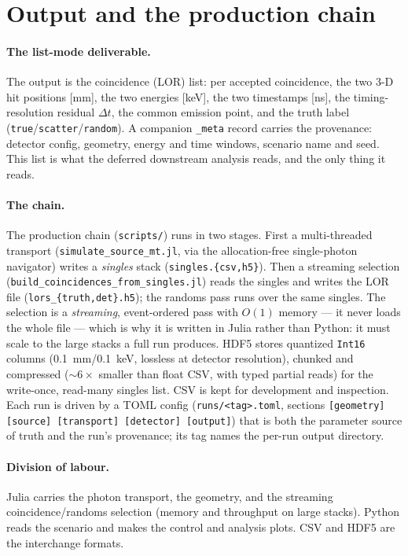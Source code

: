 \documentclass[11pt]{article}
\begin{document}
\section{Output and the production chain}
\label{sec:output}

\paragraph{The list-mode deliverable.}
The output is the coincidence (LOR) list: per accepted coincidence, the two \mbox{3-D} hit
positions [\si{mm}], the two energies [\si{keV}], the two timestamps [\si{ns}], the
timing-resolution residual $\Delta t$, the common emission point, and the truth label
(\texttt{true}/\texttt{scatter}/\texttt{random}). A companion \texttt{\_meta} record carries
the provenance: detector config, geometry, energy and time windows, scenario name and seed.
This list is what the deferred downstream analysis reads, and the only thing it reads.

\paragraph{The chain.}
The production chain (\texttt{scripts/}) runs in two stages. First a multi-threaded transport
(\texttt{simulate\_source\_mt.jl}, via the allocation-free single-photon navigator) writes a
\emph{singles} stack (\texttt{singles.\{csv,h5\}}). Then a streaming selection
(\texttt{build\_coincidences\_from\_singles.jl}) reads the singles and writes the LOR file
(\texttt{lors\_\{truth,det\}.h5}); the randoms pass runs over the same singles. The selection
is a \emph{streaming}, event-ordered pass with $O(1)$ memory --- it never loads the whole
file --- which is why it is written in Julia rather than Python: it must scale to the large
stacks a full run produces. HDF5 stores quantized \texttt{Int16} columns
(\SI{0.1}{mm}/\SI{0.1}{keV}, lossless at detector resolution), chunked and compressed
($\sim 6\times$ smaller than float CSV, with typed partial reads) for the write-once,
read-many singles list. CSV is kept for development and inspection. Each run is driven by a
TOML config (\texttt{runs/<tag>.toml}, sections
\texttt{[geometry] [source] [transport] [detector] [output]}) that is both the parameter
source of truth and the run's provenance; its tag names the per-run output directory.

\paragraph{Division of labour.}
Julia carries the photon transport, the geometry, and the streaming coincidence/randoms
selection (memory and throughput on large stacks). Python reads the scenario and makes the
control and analysis plots. CSV and HDF5 are the interchange formats.
\end{document}
